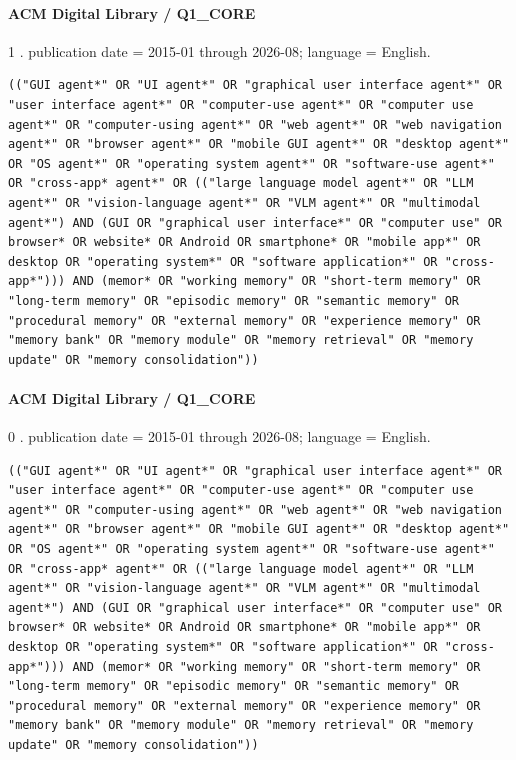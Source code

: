 \noindent\begin{minipage}{\linewidth}
\paragraph{ACM Digital Library / Q1\_CORE}
1 .
publication date = 2015-01 through 2026-08; language = English.
\begin{lstlisting}
(("GUI agent*" OR "UI agent*" OR "graphical user interface agent*" OR "user interface agent*" OR "computer-use agent*" OR "computer use agent*" OR "computer-using agent*" OR "web agent*" OR "web navigation agent*" OR "browser agent*" OR "mobile GUI agent*" OR "desktop agent*" OR "OS agent*" OR "operating system agent*" OR "software-use agent*" OR "cross-app* agent*" OR (("large language model agent*" OR "LLM agent*" OR "vision-language agent*" OR "VLM agent*" OR "multimodal agent*") AND (GUI OR "graphical user interface*" OR "computer use" OR browser* OR website* OR Android OR smartphone* OR "mobile app*" OR desktop OR "operating system*" OR "software application*" OR "cross-app*"))) AND (memor* OR "working memory" OR "short-term memory" OR "long-term memory" OR "episodic memory" OR "semantic memory" OR "procedural memory" OR "external memory" OR "experience memory" OR "memory bank" OR "memory module" OR "memory retrieval" OR "memory update" OR "memory consolidation"))
\end{lstlisting}
\end{minipage}\par\medskip
\noindent\begin{minipage}{\linewidth}
\paragraph{ACM Digital Library / Q1\_CORE}
0 .
publication date = 2015-01 through 2026-08; language = English.
\begin{lstlisting}
(("GUI agent*" OR "UI agent*" OR "graphical user interface agent*" OR "user interface agent*" OR "computer-use agent*" OR "computer use agent*" OR "computer-using agent*" OR "web agent*" OR "web navigation agent*" OR "browser agent*" OR "mobile GUI agent*" OR "desktop agent*" OR "OS agent*" OR "operating system agent*" OR "software-use agent*" OR "cross-app* agent*" OR (("large language model agent*" OR "LLM agent*" OR "vision-language agent*" OR "VLM agent*" OR "multimodal agent*") AND (GUI OR "graphical user interface*" OR "computer use" OR browser* OR website* OR Android OR smartphone* OR "mobile app*" OR desktop OR "operating system*" OR "software application*" OR "cross-app*"))) AND (memor* OR "working memory" OR "short-term memory" OR "long-term memory" OR "episodic memory" OR "semantic memory" OR "procedural memory" OR "external memory" OR "experience memory" OR "memory bank" OR "memory module" OR "memory retrieval" OR "memory update" OR "memory consolidation"))
\end{lstlisting}
\end{minipage}\par\medskip
